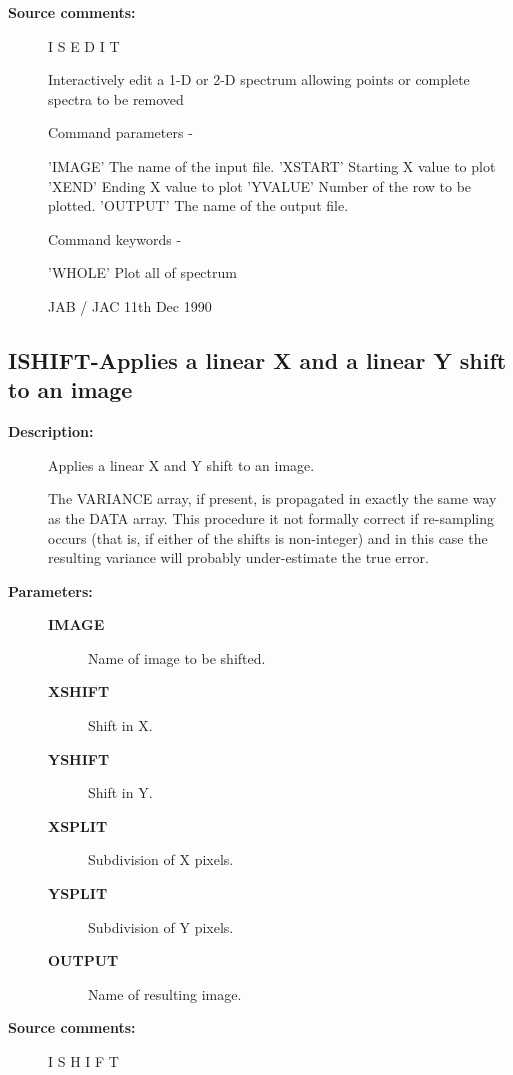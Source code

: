 \begin{description}
\begin{description}
\item [\textbf{Source comments:}]
\begin{terminalv}
 I S E D I T

 Interactively edit a 1-D or 2-D spectrum allowing points or
 complete spectra to be removed

 Command parameters -

 'IMAGE'    The name of the input file.
 'XSTART'   Starting X value to plot
 'XEND'     Ending X value to plot
 'YVALUE'   Number of the row to be plotted.
 'OUTPUT'   The name of the output file.

 Command keywords -

 'WHOLE'    Plot all of spectrum


                                 JAB / JAC 11th Dec 1990
\end{terminalv}
\end{description}
\subsection{ISHIFT-\label{ISHIFT}Applies a linear X and a linear Y shift to an image}
\begin{description}

\item [\textbf{Description:}]
 Applies a linear X and Y shift to an image.

 The VARIANCE array, if present, is propagated in exactly the same
 way as the DATA array.  This procedure it not formally correct if
 re-sampling occurs (that is, if either of the shifts is non-integer)
 and in this case the resulting variance will probably under-estimate
 the true error.

\item [\textbf{Parameters:}]
\begin{description}
\item [\textbf{IMAGE}]
 Name of image to be shifted.
\item [\textbf{XSHIFT}]
 Shift in X.
\item [\textbf{YSHIFT}]
 Shift in Y.
\item [\textbf{XSPLIT}]
 Subdivision of X pixels.
\item [\textbf{YSPLIT}]
 Subdivision of Y pixels.
\item [\textbf{OUTPUT}]
 Name of resulting image.
\end{description}

\item [\textbf{Source comments:}]
\begin{terminalv}
 I S H I F T


\end{terminalv}
\end{description}
\end{description}
